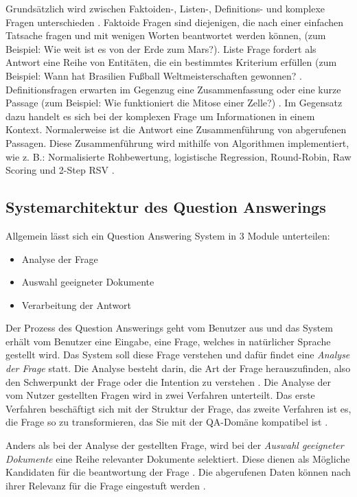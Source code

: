 \documentclass[
        ngerman,
        paper=a4,
        numbers=noendperiod,
]{scrreprt}
\begin{document}
Grundsätzlich wird zwischen Faktoiden-, Listen-, Definitions- und komplexe Fragen unterschieden \citep{Kolomiyets2011APerspective}. Faktoide Fragen sind diejenigen, die nach einer einfachen Tatsache fragen und mit wenigen Worten beantwortet werden können, (zum Beispiel: Wie weit ist es von der Erde zum Mars?). Liste Frage fordert als Antwort eine Reihe von Entitäten, die ein bestimmtes Kriterium erfüllen (zum Beispiel: Wann hat Brasilien Fußball Weltmeisterschaften gewonnen? \citep{Heie2012QuestionModelling}. Definitionsfragen erwarten im Gegenzug eine Zusammenfassung oder eine kurze Passage (zum Beispiel: Wie funktioniert die Mitose einer Zelle?) \citep{Neves2015QuestionBiology}. Im Gegensatz dazu handelt es sich bei der komplexen Frage um Informationen in einem Kontext. Normalerweise ist die Antwort eine Zusammenführung von abgerufenen Passagen. Diese Zusammenführung wird mithilfe von Algorithmen implementiert, wie z. B.: Normalisierte Rohbewertung, logistische Regression, Round-Robin, Raw Scoring und 2-Step RSV \citep{Garcia-CumbrerasArchitectureSystem}.


\subsection{Systemarchitektur des Question Answerings} %
Allgemein lässt sich ein Question Answering System in 3 Module unterteilen:
\begin{itemize}
    \item Analyse der Frage
    \item Auswahl geeigneter Dokumente
    \item Verarbeitung der Antwort
\end{itemize}

Der Prozess des Question Answerings geht vom Benutzer aus und das System erhält vom Benutzer eine Eingabe, eine Frage, welches in natürlicher Sprache gestellt wird. Das System soll diese Frage verstehen und dafür findet eine \textit{Analyse der Frage} statt. Die Analyse besteht darin, die Art der Frage herauszufinden, also den Schwerpunkt der Frage oder die Intention zu verstehen \citep{Malik2013DomainSystem}. Die Analyse der vom Nutzer gestellten Fragen wird in zwei Verfahren unterteilt. Das erste Verfahren beschäftigt sich mit der Struktur der Frage, das zweite Verfahren ist es, die Frage so zu transformieren, das Sie mit der QA-Domäne kompatibel ist \citep{Hamed2016AClassification}.

Anders als bei der Analyse der gestellten Frage, wird bei der \textit{Auswahl geeigneter Dokumente} eine Reihe relevanter Dokumente selektiert. Diese dienen als Mögliche Kandidaten für die beantwortung der Frage \cite{Malik2013DomainSystem}. Die abgerufenen Daten können nach ihrer Relevanz für die Frage eingestuft werden \citep{Neves2015QuestionBiology}. 
\end{document}
